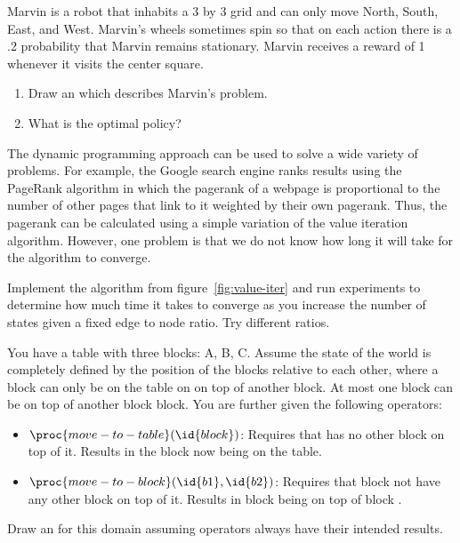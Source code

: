 \begin{exercises}
\item Marvin is a robot that inhabits a 3 by 3 grid and can only move
  North, South, East, and West. Marvin's wheels sometimes spin so that
  on each action there is a .2 probability that Marvin remains
  stationary. Marvin receives a reward of 1 whenever it visits the
  center square.
  \begin{enumerate}
  \item Draw an  which describes Marvin's problem.
  \item What is the optimal policy?
  \end{enumerate}

\item The dynamic programming approach can be used to solve a wide
  variety of problems. For example, the Google search engine ranks
  results using the PageRank algorithm in which the pagerank of a
  webpage is proportional to the number of other pages that link to it
  weighted by their own pagerank. Thus, the pagerank can be calculated
  using a simple variation of the value iteration algorithm. However,
  one problem is that we do not know how long it will take for the
  algorithm to converge.

  Implement the  algorithm from
  figure~\ref{fig:value-iter} and run experiments to determine how
  much time it takes to converge as you increase the number of states
  given a fixed edge to node ratio. Try different ratios.


\item You have a table with three blocks: A, B, C. Assume the state of
  the world is completely defined by the position of the blocks
  relative to each other, where a block can only be on the table on on
  top of another block. At most one block can be on top of another
  block block. You are further given the following operators:
  \begin{itemize}
  \item $\proc{move-to-table}(\id{block})$: Requires that 
    has no other block on top of it. Results in the block now being on
    the table.
  \item $\proc{move-to-block}(\id{b1}, \id{b2})$: Requires that block
     not have any other block on top of it. Results in block
     being on top of block .
  \end{itemize}
  Draw an  for this domain assuming operators always have
  their intended results.



\end{exercises}
